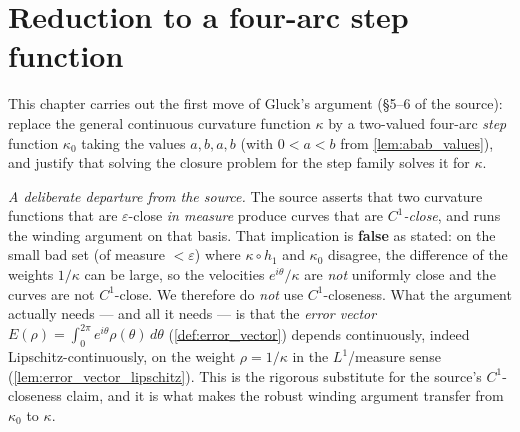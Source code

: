 \chapter{Reduction to a four-arc step function}
\label{chap:stepreduction}


This chapter carries out the first move of Gluck's argument (\S5--6 of the
source): replace the general continuous curvature function $\kappa$ by a
two-valued four-arc \emph{step} function $\kappa_0$ taking the values $a, b, a, b$
(with $0 < a < b$ from \cref{lem:abab_values}), and justify that solving the
closure problem for the step family solves it for $\kappa$.

\medskip

\noindent\emph{A deliberate departure from the source.} The source asserts that
two curvature functions that are $\varepsilon$-close \emph{in measure} produce
curves that are \emph{$C^1$-close}, and runs the winding argument on that basis.
That implication is \textbf{false} as stated: on the small bad set (of measure
$<\varepsilon$) where $\kappa\circ h_1$ and $\kappa_0$ disagree, the difference of
the weights $1/\kappa$ can be large, so the velocities $e^{i\theta}/\kappa$ are
\emph{not} uniformly close and the curves are not $C^1$-close. We therefore do
\emph{not} use $C^1$-closeness. What the argument actually needs --- and all it
needs --- is that the \emph{error vector} $E(\rho) = \int_0^{2\pi}
e^{i\theta}\rho(\theta)\,d\theta$ (\cref{def:error_vector}) depends continuously,
indeed Lipschitz-continuously, on the weight $\rho = 1/\kappa$ in the
$L^1$/measure sense (\cref{lem:error_vector_lipschitz}). This is the rigorous
substitute for the source's $C^1$-closeness claim, and it is what makes the
robust winding argument transfer from $\kappa_0$ to $\kappa$.

